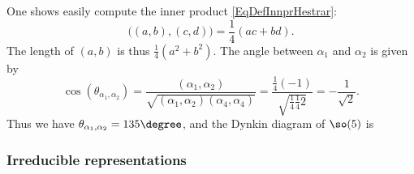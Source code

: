 One shows easily compute the inner product \eqref{EqDefInnprHestrar}:
\begin{equation}		\label{EqPridScalacbdroot}
	\big( (a,b),(c,d) \big)	= \frac{1}{ 4 }(ac+bd).
\end{equation}
The length of $(a,b)$ is thus $\frac{1}{ 4 }(a^2+b^2)$. The angle between $\alpha_1$ and $\alpha_2$ is given by
\begin{equation}
	\cos(\theta_{\alpha_1,\alpha_2})=\frac{ (\alpha_1,\alpha_2) }{ \sqrt{(\alpha_1,\alpha_2)(\alpha_4,\alpha_4)} }=\frac{ \frac{1}{ 4 }(-1) }{ \sqrt{ \frac{1}{ 4 }\frac{1}{ 4 }2  } }=-\frac{1}{  \sqrt{2} }.
\end{equation}
Thus we have $\theta_{\alpha_1,\alpha_2}=135\degree$, and the Dynkin diagram of $\so(5)$ is
\begin{center}
   
\end{center}

\subsubsection{Irreducible representations}


